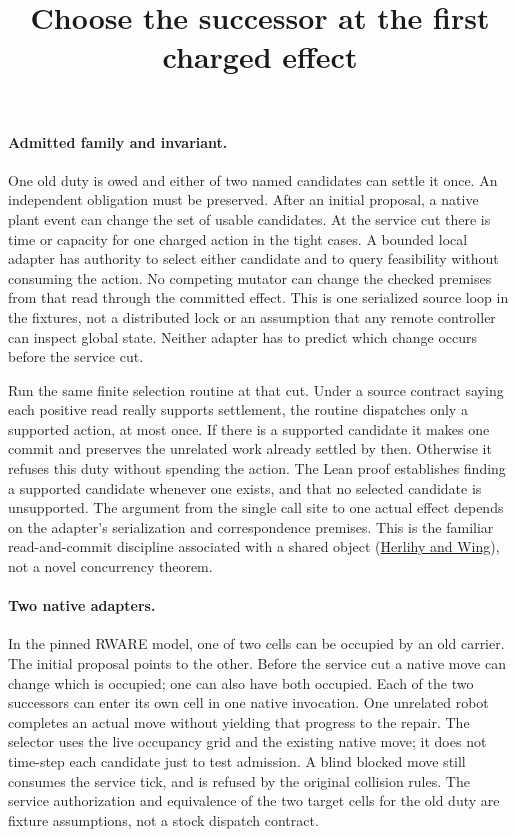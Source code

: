 \documentclass{article}
\title{Choose the successor at the first charged effect}
\author{}
\date{}
\begin{document}
\maketitle
\paragraph{Admitted family and invariant.}
One old duty is owed and either of two named candidates can settle it
once. An independent obligation must be preserved. After an initial
proposal, a native plant event can change the set of usable candidates.
At the service cut there is time or capacity for one charged action
in the tight cases. A bounded local adapter has authority to select
either candidate and to query feasibility without consuming the action.
No competing mutator can change the checked premises from that read
through the committed effect. This is one serialized source loop in
the fixtures, not a distributed lock or an assumption that any remote
controller can inspect global state. Neither adapter has to predict
which change occurs before the service cut.

Run the same finite selection routine at that cut. Under a source
contract saying each positive read really supports settlement, the
routine dispatches only a supported action, at most once. If there is a
supported candidate it makes one commit and preserves the unrelated
work already settled by then. Otherwise it refuses this duty without
spending the action. The Lean proof establishes finding a supported
candidate whenever one exists, and that no selected candidate is
unsupported. The argument from the single call site to one actual
effect depends on the adapter's serialization and correspondence
premises. This is the familiar read-and-commit discipline
associated with a shared object
(\href{https://www.cs.cmu.edu/~wing/publications/HerlihyWing90.pdf}{Herlihy and Wing}),
not a novel concurrency theorem.

\paragraph{Two native adapters.}
In the pinned RWARE model, one of two cells can be occupied by an old
carrier. The initial proposal points to the other. Before the service
cut a native move can change which is occupied; one can also have
both occupied. Each of the two successors can enter its own cell in
one native invocation. One unrelated robot completes an actual
move without yielding that progress to the repair. The selector uses
the live occupancy grid and the existing native move; it does not
time-step each candidate just to test admission. A blind blocked
move still consumes the service tick, and is refused by the original
collision rules. The service authorization and equivalence of the
two target cells for the old duty are fixture assumptions, not a
stock dispatch contract.
\end{document}
